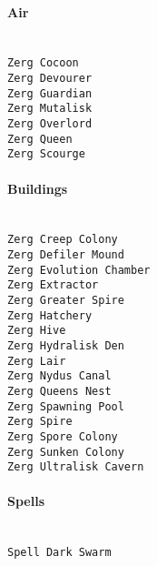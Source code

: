 \paragraph{Air} \mbox{}\\
\verb|Zerg Cocoon| \\
\verb|Zerg Devourer| \\
\verb|Zerg Guardian| \\
\verb|Zerg Mutalisk| \\
\verb|Zerg Overlord| \\
\verb|Zerg Queen| \\
\verb|Zerg Scourge|

\paragraph{Buildings} \mbox{}\\
\verb|Zerg Creep Colony| \\
\verb|Zerg Defiler Mound| \\
\verb|Zerg Evolution Chamber| \\
\verb|Zerg Extractor| \\
\verb|Zerg Greater Spire| \\
\verb|Zerg Hatchery| \\
\verb|Zerg Hive| \\
\verb|Zerg Hydralisk Den| \\
\verb|Zerg Lair| \\
\verb|Zerg Nydus Canal| \\
\verb|Zerg Queens Nest| \\
\verb|Zerg Spawning Pool| \\
\verb|Zerg Spire| \\
\verb|Zerg Spore Colony| \\
\verb|Zerg Sunken Colony| \\
\verb|Zerg Ultralisk Cavern|

\paragraph{Spells} \mbox{}\\
\verb|Spell Dark Swarm|
